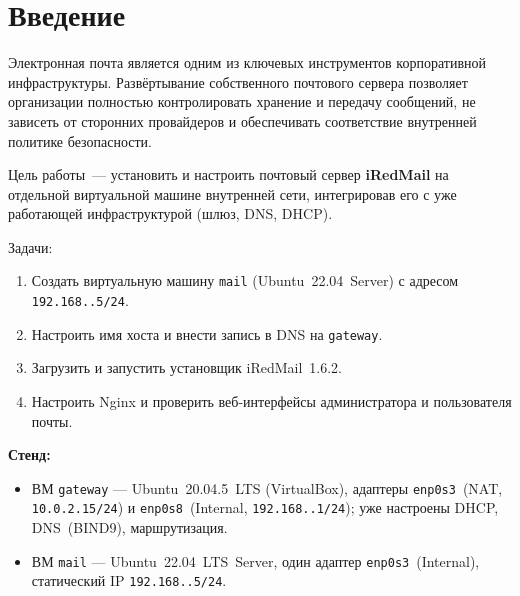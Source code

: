 \chapter*{Введение}
\label{ch:intro}

Электронная почта является одним из ключевых инструментов корпоративной
инфраструктуры. Развёртывание собственного почтового сервера позволяет
организации полностью контролировать хранение и передачу сообщений,
не зависеть от сторонних провайдеров и обеспечивать соответствие
внутренней политике безопасности.

Цель работы~— установить и настроить почтовый сервер \textbf{iRedMail}
на отдельной виртуальной машине внутренней сети,
интегрировав его с уже работающей инфраструктурой (шлюз, DNS, DHCP).

Задачи:
\begin{enumerate}
  \item Создать виртуальную машину \texttt{mail} (Ubuntu~22.04~Server)
        с адресом \texttt{192.168.\cfgLabStudentN.5/24}.
  \item Настроить имя хоста и внести запись в DNS на \texttt{gateway}.
  \item Загрузить и запустить установщик iRedMail~1.6.2.
  \item Настроить Nginx и проверить веб-интерфейсы администратора и
        пользователя почты.
\end{enumerate}

\textbf{Стенд:}
\begin{itemize}
  \item ВМ \texttt{gateway} — Ubuntu~20.04.5~LTS (VirtualBox),
        адаптеры \texttt{enp0s3}~(NAT, \texttt{10.0.2.15/24})
        и \texttt{enp0s8}~(Internal, \texttt{192.168.\cfgLabStudentN.1/24});
        уже настроены DHCP, DNS~(BIND9), маршрутизация.
  \item ВМ \texttt{mail} — Ubuntu~22.04~LTS~Server,
        один адаптер \texttt{enp0s3}~(Internal),
        статический IP \texttt{192.168.\cfgLabStudentN.5/24}.
\end{itemize}

\endinput
